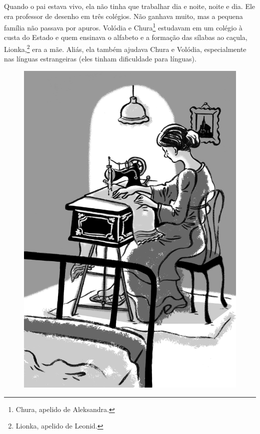 Quando o pai estava vivo, ela não tinha que trabalhar dia e noite, noite
e dia. Ele era professor de desenho em três colégios. Não ganhava muito,
mas a pequena família não passava por apuros. Volódia e Chura\footnote{Chura,
  apelido de Aleksandra.} estudavam em um colégio à custa do Estado e
quem ensinava o alfabeto e a formação das sílabas ao caçula,
Lionka,\footnote{Lionka, apelido de Leonid.} era a mãe. Aliás, ela
também ajudava Chura e Volódia, especialmente nas línguas estrangeiras
(eles tinham dificuldade para línguas).

\begin{figure}%
\vspace*{-2cm}
\hspace*{-2.4cm}\includegraphics{./imgs/cena13.jpg}
\end{figure}

